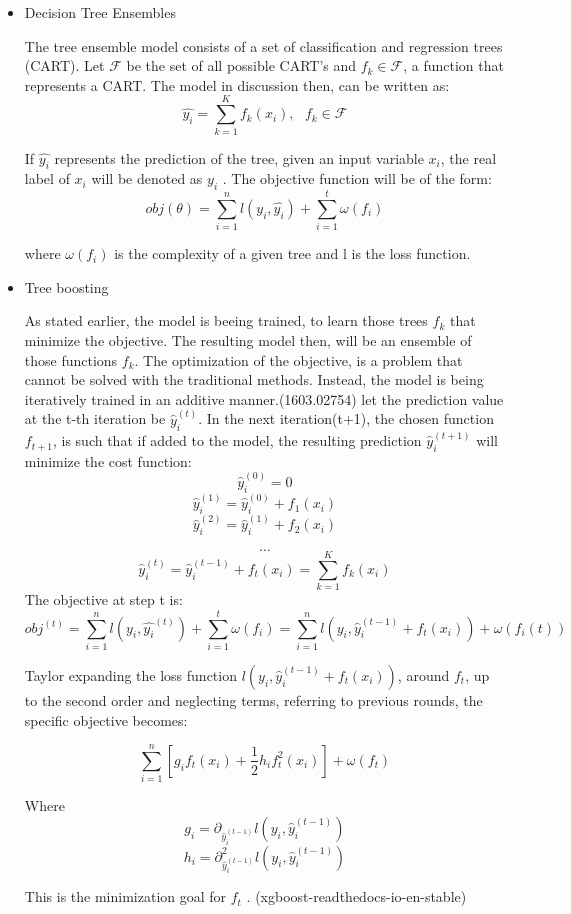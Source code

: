 \begin{itemize}
\item Decision Tree Ensembles
\label{sec:org8a2fddb}

The tree ensemble model consists of a set of classification and regression trees (CART).
Let \(\mathcal{F}\) be the set of all possible CART's and \(f_{k} \in \mathcal{F}\), a function that represents a CART. The model in discussion then, can be written as:
\[
\hat{y_{i}} = \sum_{k=1}^{K} f_{k}(x_{i}),\text{ } f_{k} \in \mathcal{F}
\]

If \(\hat{y_{i}}\) represents the prediction of the tree, given an input variable \(x_{i}\), the real label of \(x_{i}\) will be denoted as \(y_{i}\)  . The objective function will be of the form:
\[
obj(\theta) = \sum_{i=1}^{n} l(y_{i}, \hat{y_{i}}) + \sum_{i=1}^{t}\omega(f_{i})
\]

where \(\omega(f_{i})\) is the complexity of a given tree  and l is the loss function.

\item Tree boosting
\label{sec:orgbee4670}

As stated earlier, the model is beeing trained, to learn those trees \(f_{k}\) that minimize the objective. The resulting model then, will be an ensemble of those functions \(f_{k}\).
The optimization of the objective, is a problem that cannot be solved with the traditional methods. Instead, the model is being iteratively trained in an additive manner.(1603.02754)
let the prediction value at the t-th iteration be \(\hat{y}^{(t)}_{i}\). In the next iteration(t+1), the chosen function \(f_{t+1}\), is such that if added to the model, the resulting prediction \(\hat{y}^{(t+1)}_{i}\) will minimize the cost function:
\[
\hat{y}^{(0)}_{i} = 0 \]
\[
\hat{y}^{(1)}_{i} =\hat{y}^{(0)}_{i} + f_{1}(x_{i}) 
\]
\[
\hat{y}^{(2)}_{i} =\hat{y}^{(1)}_{i} + f_{2}(x_{i}) 
\]

\[
\dots
\]
\[
\hat{y}_{i}^{(t)} = \hat{y}_{i}^{(t-1)} + f_{t}(x_{i})= \sum_{k=1}^{K} f_{k}(x_{i})
\]
The objective at step t is:
\[
obj^{(t)} = \sum_{i=1}^{n} l(y_{i}, \hat{y_{i}}^{(t)}) + \sum_{i=1}^{t}\omega(f_{i}) = \sum _{i=1}^{n} l(y_{i}, \hat{y}_{i}^{(t-1)} + f_{t}(x_{i})) + \omega(f_{i}(t))
\]

Taylor expanding the loss function \(l(y_{i}, \hat{y}_{i}^{(t-1)} + f_{t}(x_{i}))\), around \(f_{t}\), up to the second order and neglecting terms, referring to previous rounds, the specific objective becomes:

\[
\sum_{i=1}^{n}\left [ g_{i}f_{t}(x_{i})+\frac{1}{2}h_{i}f^{2}_{t} (x_{i}) \right ] + \omega(f_{t})
\]

Where
\[
g_{i} = \partial_{\hat{y}_{i}^{(t-1) }} l(y_{i}, \hat{y}_{i}^{(t-1)} )
\]
\[
h_{i} = \partial^{2}_{\hat{y}_{i}^{(t-1) }} l(y_{i}, \hat{y}_{i}^{(t-1)} )
\]

This is the minimization goal for \(f_{t}\) . (xgboost-readthedocs-io-en-stable)
\end{itemize}
